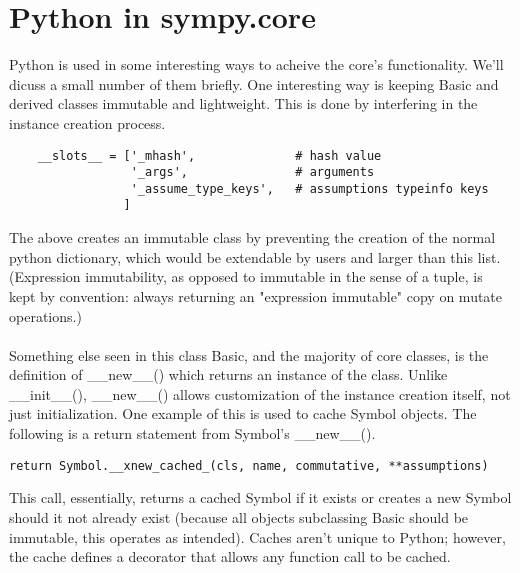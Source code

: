 \documentclass[11pt,a4paper,oneside]{report}
\begin{document}
\section*{Python in sympy.core}
Python is used in some interesting ways to acheive the core's functionality. We'll dicuss a small number of them briefly. One interesting way is keeping Basic and derived classes immutable and lightweight. This is done by interfering in the instance creation process.
\begin{verbatim}
    __slots__ = ['_mhash',              # hash value
                 '_args',               # arguments
                 '_assume_type_keys',   # assumptions typeinfo keys
                ]
\end{verbatim}
The above creates an immutable class by preventing the creation of the normal python dictionary, which would be extendable by users and larger than this list. (Expression immutability, as opposed to immutable in the sense of a tuple, is kept by convention: always returning an "expression immutable" copy on mutate operations.) \\\\
Something else seen in this class Basic, and the majority of core classes, is the definition of \_\_new\_\_() which returns an instance of the class. Unlike \_\_init\_\_(), \_\_new\_\_() allows customization of the instance creation itself, not just initialization. One example of this is used to cache Symbol objects. The following is a return statement from Symbol's \_\_new\_\_().
\begin{verbatim}
return Symbol.__xnew_cached_(cls, name, commutative, **assumptions)
\end{verbatim}
This call, essentially, returns a cached Symbol if it exists or creates a new Symbol should it not already exist (because all objects subclassing Basic should be immutable, this operates as intended). Caches aren't unique to Python; however, the cache defines a decorator that allows any function call to be cached.
\end{document}
